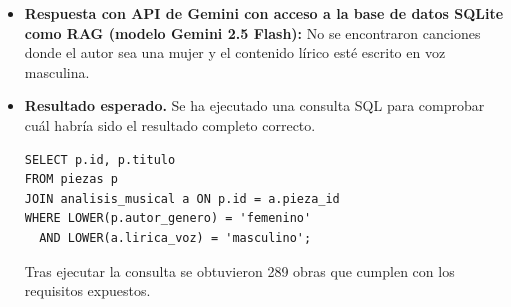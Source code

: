 \begin{itemize}
4. **Consultar bibliografía especializada**: Los estudios sobre la historia de la música y los análisis de composiciones pueden ser valiosos para entender cómo han contribuido las mujeres a la creación musical.

Si tienes más información o necesitas ayuda con otro aspecto relacionado, no dudes en preguntar."
\item \textbf{Respuesta con API de Gemini con acceso a la base de datos SQLite como RAG (modelo Gemini 2.5 Flash):} No se encontraron canciones donde el autor sea una mujer y el contenido lírico esté escrito en voz masculina.
    \item \textbf{Resultado esperado.} Se ha ejecutado una consulta SQL para comprobar cuál habría sido el resultado completo correcto.
    \begin{verbatim}
SELECT p.id, p.titulo
FROM piezas p
JOIN analisis_musical a ON p.id = a.pieza_id
WHERE LOWER(p.autor_genero) = 'femenino'
  AND LOWER(a.lirica_voz) = 'masculino';
    \end{verbatim}    
    Tras ejecutar la consulta se obtuvieron 289 obras que cumplen con los requisitos expuestos.



\end{itemize}

